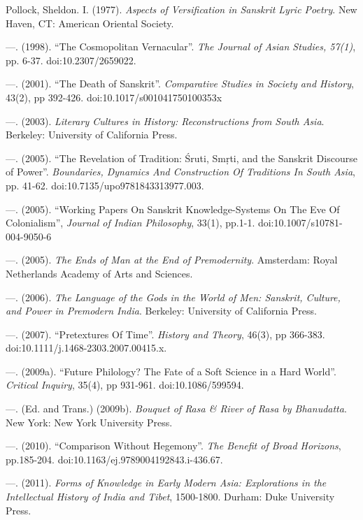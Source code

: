 \begin{thebibliography}{99}
  Pollock, Sheldon. I. (1977). \textit{Aspects of Versification in Sanskrit Lyric Poetry}. New Haven, CT: American Oriental Society.

  —. (1998). “The Cosmopolitan Vernacular”. \textit{The Journal of Asian Studies, 57(1)}, pp. 6-37. doi:10.2307/2659022.

  —. (2001). “The Death of Sanskrit”. \textit{Comparative Studies in Society and History}, 43(2), pp 392-426. doi:10.1017/s001041750100353x

  —. (2003). \textit{Literary Cultures in History: Reconstructions from South Asia}. Berkeley: University of California Press.

  —. (2005). “The Revelation of Tradition: Śruti, Smṛti, and the Sanskrit Discourse of Power”. \textit{Boundaries, Dynamics And Construction Of Traditions In South Asia}, pp. 41-62. doi:10.7135/upo9781843313977.003.

  —. (2005). “Working Papers On Sanskrit Knowledge-Systems On The Eve Of Colonialism”, \textit{Journal of Indian Philosophy}, 33(1), pp.1-1. doi:10.1007/s10781-004-9050-6

  —. (2005). \textit{The Ends of Man at the End of Premodernity}. Amsterdam: Royal Netherlands Academy of Arts and Sciences.

  —. (2006). \textit{The Language of the Gods in the World of Men: Sanskrit, Culture, and Power in Premodern India}. Berkeley: University of California Press.

  —. (2007). “Pretextures Of Time”. \textit{History and Theory}, 46(3), pp 366-383. doi:10.1111/j.1468-2303.2007.00415.x.

  —. (2009a). “Future Philology? The Fate of a Soft Science in a Hard World”. \textit{Critical Inquiry}, 35(4), pp 931-961. doi:10.1086/599594.

  —. (Ed. and Trans.) (2009b). \textit{Bouquet of Rasa \& River of Rasa by Bhanudatta}. New York: New York University Press.

  —. (2010). “Comparison Without Hegemony”. \textit{The Benefit of Broad Horizons}, pp.185-204. doi:10.1163/ej.9789004192843.i-436.67.

  —. (2011). \textit{Forms of Knowledge in Early Modern Asia: Explorations in the Intellectual History of India and Tibet}, 1500-1800. Durham: Duke University Press.


\end{thebibliography}
